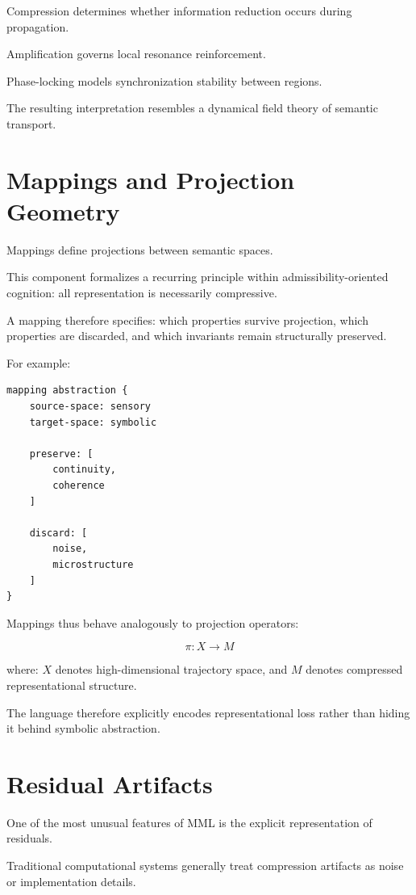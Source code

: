 \documentclass[11pt]{article}
\begin{document}
Compression determines whether information reduction occurs during propagation.

Amplification governs local resonance reinforcement.

Phase-locking models synchronization stability between regions.

The resulting interpretation resembles a dynamical field theory of semantic transport.

\section{Mappings and Projection Geometry}

Mappings define projections between semantic spaces.

This component formalizes a recurring principle within admissibility-oriented cognition:
all representation is necessarily compressive.

A mapping therefore specifies:
which properties survive projection,
which properties are discarded,
and which invariants remain structurally preserved.

For example:

\begin{lstlisting}
mapping abstraction {
    source-space: sensory
    target-space: symbolic

    preserve: [
        continuity,
        coherence
    ]

    discard: [
        noise,
        microstructure
    ]
}
\end{lstlisting}

Mappings thus behave analogously to projection operators:

\[
\pi : X \rightarrow M
\]

where:
$X$ denotes high-dimensional trajectory space,
and
$M$ denotes compressed representational structure.

The language therefore explicitly encodes representational loss rather than hiding it behind symbolic abstraction.

\section{Residual Artifacts}

One of the most unusual features of MML is the explicit representation of residuals.

Traditional computational systems generally treat compression artifacts as noise or implementation details.
\end{document}
